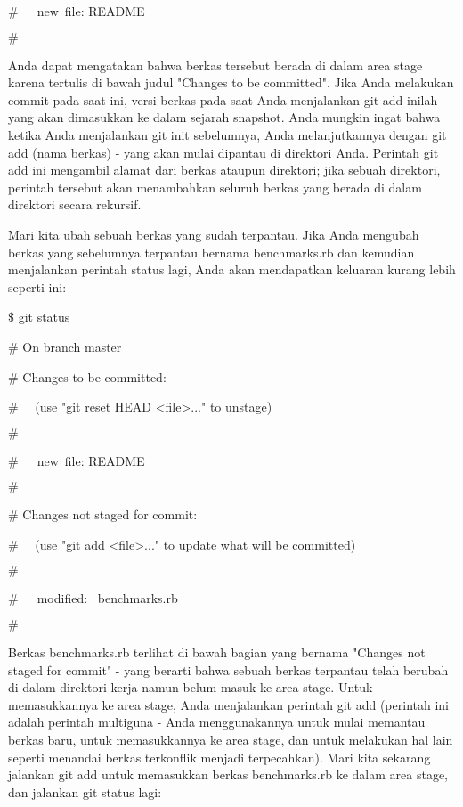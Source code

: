  $  \#  $~~~new~file:   README \par
\noindent 
 $  \#  $ \par
\noindent 
Anda dapat mengatakan bahwa berkas tersebut berada di dalam area stage karena tertulis di bawah judul "Changes to be committed". Jika Anda melakukan commit pada saat ini, versi berkas pada saat Anda menjalankan git add inilah yang akan dimasukkan ke dalam sejarah snapshot. Anda mungkin ingat bahwa ketika Anda menjalankan git init sebelumnya, Anda melanjutkannya dengan git add (nama berkas) - yang akan mulai dipantau di direktori Anda. Perintah git add ini mengambil alamat dari berkas ataupun direktori; jika sebuah direktori, perintah tersebut akan menambahkan seluruh berkas yang berada di dalam direktori secara rekursif. \par
\vspace{12pt}
\noindent 
Mari kita ubah sebuah berkas yang sudah terpantau. Jika Anda mengubah berkas yang sebelumnya terpantau bernama benchmarks.rb dan kemudian menjalankan perintah status lagi, Anda akan mendapatkan keluaran kurang lebih seperti ini: \par
\vspace{12pt}
\noindent 
 $  \$  $ git status \par
\noindent 
 $  \#  $ On branch master \par
\noindent 
 $  \#  $ Changes to be committed: \par
\noindent 
 $  \#  $~~ (use "git reset HEAD <file>..." to unstage) \par
\noindent 
 $  \#  $ \par
\noindent 
 $  \#  $~~~new~file:   README \par
\noindent 
 $  \#  $ \par
\noindent 
 $  \#  $ Changes not staged for commit: \par
\noindent 
 $  \#  $~~ (use "git add <file>..." to update what will be committed) \par
\noindent 
 $  \#  $ \par
\noindent 
 $  \#  $~~~modified:~  benchmarks.rb \par
\noindent 
 $  \#  $ \par
\vspace{12pt}
\vspace{12pt}
\noindent 
Berkas benchmarks.rb terlihat di bawah bagian yang bernama "Changes not staged for commit" - yang berarti bahwa sebuah berkas terpantau telah berubah di dalam direktori kerja namun belum masuk ke area stage. Untuk memasukkannya ke area stage, Anda menjalankan perintah git add (perintah ini adalah perintah multiguna - Anda menggunakannya untuk mulai memantau berkas baru, untuk memasukkannya ke area stage, dan untuk melakukan hal lain seperti menandai berkas terkonflik menjadi terpecahkan). Mari kita sekarang jalankan git add untuk memasukkan berkas benchmarks.rb ke dalam area stage, dan jalankan git status lagi: \par

